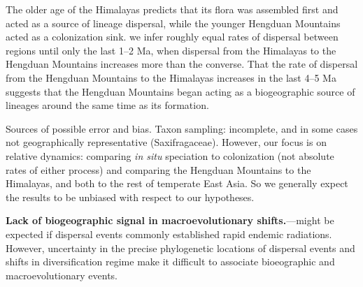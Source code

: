 The older age of the Himalayas predicts that its flora was assembled first and acted as a source of lineage dispersal, while the younger Hengduan Mountains acted as a colonization sink. %
we infer roughly equal rates of dispersal between regions until only the last 1--2 Ma, when dispersal from the Himalayas to the Hengduan Mountains increases more than the converse. That the rate of dispersal from the Hengduan Mountains to the Himalayas increases in the last 4--5 Ma suggests that the Hengduan Mountains began acting as a biogeographic source of lineages around the same time as its formation. %


Sources of possible error and bias. Taxon sampling: incomplete, and in some cases not geographically representative (Saxifragaceae). However, our focus is on relative dynamics: comparing \textit{in situ} speciation to colonization (not absolute rates of either process) and comparing the Hengduan Mountains to the Himalayas, and both to the rest of temperate East Asia. So we generally expect the results to be unbiased with respect to our hypotheses.

\textbf{Lack of biogeographic signal in macroevolutionary shifts.}---might be expected if dispersal events commonly established rapid endemic radiations. However, uncertainty in the precise phylogenetic locations of dispersal events and shifts in diversification regime make it difficult to associate bioeographic and macroevolutionary events.


